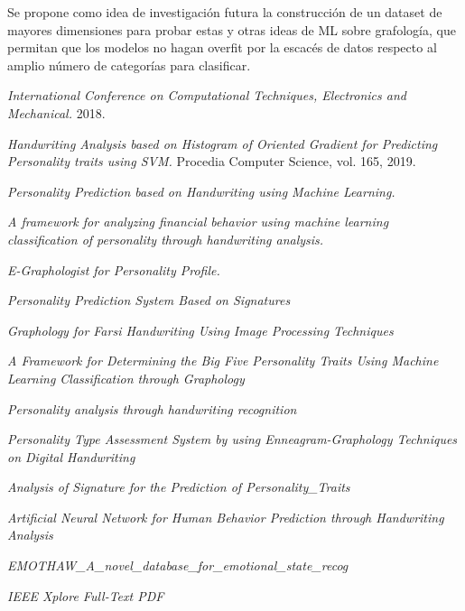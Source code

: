 \documentclass[10pt, a4paper]{article}
\begin{document}
        Se propone como idea de investigaci\'on futura la construcci\'on de un dataset de mayores dimensiones para probar estas y otras ideas de ML sobre grafolog\'ia, que 
        permitan que los modelos no hagan overfit por la escac\'es de datos respecto al amplio n\'umero de categor\'ias para clasificar. 

\begin{thebibliography}{99}
         \emph{International Conference on Computational Techniques, Electronics and Mechanical.} 2018. 
    
         \emph{Handwriting Analysis based on Histogram of Oriented Gradient for Predicting Personality traits using SVM.} Procedia Computer Science, vol. 165, 2019.
    
         \emph{Personality Prediction based on Handwriting using Machine Learning.}
        
         \emph{A framework for analyzing financial behavior using machine learning classification of personality through handwriting analysis.}
    
         \emph{E-Graphologist for Personality Profile.}

          \emph{Personality Prediction System Based on Signatures}
        
          \emph{Graphology for Farsi Handwriting Using Image Processing Techniques    }
        
          \emph{A Framework for Determining the Big Five Personality Traits Using Machine Learning Classification through Graphology}
        
          \emph{Personality analysis through handwriting recognition}
        
         \emph{Personality Type Assessment System by using  Enneagram-Graphology Techniques on Digital  Handwriting}
        
         \emph{Analysis of Signature for the Prediction of Personality\_Traits}
        
         \emph{Artificial Neural Network for Human Behavior Prediction  through Handwriting Analysis}
        
         \emph{EMOTHAW\_A\_novel\_database\_for\_emotional\_state\_recog}
        
         \emph{IEEE Xplore Full-Text PDF}
        

\end{thebibliography}
\end{document}
